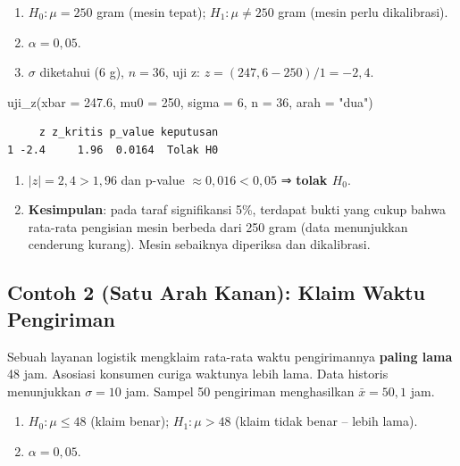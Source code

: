 \documentclass[
  indonesian,
  letterpaper,
]{book}
\newenvironment{Shaded}{\begin{snugshade}}{\end{snugshade}}
\newcommand{\AttributeTok}[1]{\textcolor[rgb]{0.40,0.45,0.13}{#1}}
\newcommand{\DecValTok}[1]{\textcolor[rgb]{0.68,0.00,0.00}{#1}}
\newcommand{\FloatTok}[1]{\textcolor[rgb]{0.68,0.00,0.00}{#1}}
\newcommand{\FunctionTok}[1]{\textcolor[rgb]{0.28,0.35,0.67}{#1}}
\newcommand{\NormalTok}[1]{\textcolor[rgb]{0.00,0.23,0.31}{#1}}
\newcommand{\StringTok}[1]{\textcolor[rgb]{0.13,0.47,0.30}{#1}}
\providecommand{\tightlist}{%
  \setlength{\itemsep}{0pt}\setlength{\parskip}{0pt}}
\begin{document}
\begin{enumerate}
\def\labelenumi{\arabic{enumi}.}
\tightlist
\item
  \(H_0: \mu = 250\) gram (mesin tepat); \(H_1: \mu \ne 250\) gram
  (mesin perlu dikalibrasi).
\item
  \(\alpha   = 0{,}05\).
\item
  \(\sigma\) diketahui (6 g), \(n = 36\), uji z:
  \(z = (247{,}6 - 250)/1 = -2{,}4\).
\end{enumerate}

\begin{Shaded}
\begin{Highlighting}[]
\FunctionTok{uji\_z}\NormalTok{(}\AttributeTok{xbar =} \FloatTok{247.6}\NormalTok{, }\AttributeTok{mu0 =} \DecValTok{250}\NormalTok{, }\AttributeTok{sigma =} \DecValTok{6}\NormalTok{, }\AttributeTok{n =} \DecValTok{36}\NormalTok{, }\AttributeTok{arah =} \StringTok{"dua"}\NormalTok{)}
\end{Highlighting}
\end{Shaded}

\begin{verbatim}
     z z_kritis p_value keputusan
1 -2.4     1.96  0.0164  Tolak H0
\end{verbatim}

\begin{enumerate}
\def\labelenumi{\arabic{enumi}.}
\setcounter{enumi}{3}
\tightlist
\item
  \(\lvert z \rvert = 2{,}4 > 1{,}96\) dan p-value
  \(\approx 0{,}016 < 0{,}05\) ⇒ \textbf{tolak \(H_0\)}.
\item
  \textbf{Kesimpulan}: pada taraf signifikansi 5\%, terdapat bukti yang
  cukup bahwa rata-rata pengisian mesin berbeda dari 250 gram (data
  menunjukkan cenderung kurang). Mesin sebaiknya diperiksa dan
  dikalibrasi.
\end{enumerate}

\subsection{Contoh 2 (Satu Arah Kanan): Klaim Waktu
Pengiriman}\label{contoh-2-satu-arah-kanan-klaim-waktu-pengiriman}

Sebuah layanan logistik mengklaim rata-rata waktu pengirimannya
\textbf{paling lama} 48 jam. Asosiasi konsumen curiga waktunya lebih
lama. Data historis menunjukkan \(\sigma = 10\) jam. Sampel 50
pengiriman menghasilkan \(\bar{x} = 50{,}1\) jam.

\begin{enumerate}
\def\labelenumi{\arabic{enumi}.}
\tightlist
\item
  \(H_0: \mu \le 48\) (klaim benar); \(H_1: \mu > 48\) (klaim tidak
  benar -- lebih lama).
\item
  \(\alpha = 0{,}05\).
\end{enumerate}
\end{document}
